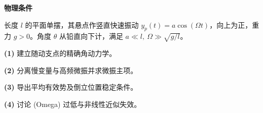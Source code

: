 \textbf{物理条件}\par 长度 \(l\) 的平面单摆，其悬点作竖直快速振动 \(y_p(t)=a\cos(\Omega t)\)，向上为正，重力 \(g>0\)。角度 \(\theta\) 从铅直向下计，满足 \(a\ll l,\ \Omega\gg\sqrt{g/l}\)。
\par\noindent\textbf{(1)} 建立随动支点的精确角动力学。
\par\noindent\textbf{(2)} 分离慢变量与高频微振并求微振主项。
\par\noindent\textbf{(3)} 导出平均有效势及倒立位置稳定条件。
\par\noindent\textbf{(4)} 讨论 (Omega) 过低与非线性近似失效。
